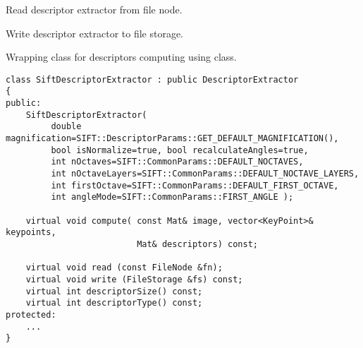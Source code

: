 \begin{description}
\end{description}

Read descriptor extractor from file node.


\begin{description}
\end{description}

Write descriptor extractor to file storage.


\begin{description}
\end{description}


Wrapping class for descriptors computing using  class.

\begin{lstlisting}
class SiftDescriptorExtractor : public DescriptorExtractor
{
public:
    SiftDescriptorExtractor( 
	     double magnification=SIFT::DescriptorParams::GET_DEFAULT_MAGNIFICATION(),
	     bool isNormalize=true, bool recalculateAngles=true,
	     int nOctaves=SIFT::CommonParams::DEFAULT_NOCTAVES,
	     int nOctaveLayers=SIFT::CommonParams::DEFAULT_NOCTAVE_LAYERS,
	     int firstOctave=SIFT::CommonParams::DEFAULT_FIRST_OCTAVE,
	     int angleMode=SIFT::CommonParams::FIRST_ANGLE );

    virtual void compute( const Mat& image, vector<KeyPoint>& keypoints, 
                          Mat& descriptors) const;

    virtual void read (const FileNode &fn);
    virtual void write (FileStorage &fs) const;
    virtual int descriptorSize() const;
    virtual int descriptorType() const;
protected:
    ...
}
\end{lstlisting}

